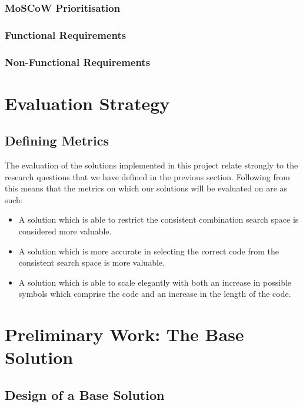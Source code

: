 \documentclass[12pt]{article}  %
\theoremstyle{definition}
\theoremstyle{remark}
\begin{document}
\subsubsection {MoSCoW Prioritisation}

\subsubsection {Functional Requirements}

\subsubsection {Non-Functional Requirements}

\newpage                     %
\section{Evaluation Strategy}\label{ss:back}

\subsection {Defining Metrics}

The evaluation of the solutions implemented in this project relate strongly to the research questions that we have defined in the previous section. Following from this means that the metrics on which our solutions will be evaluated on are as such:
\begin {itemize}
	\item {A solution which is able to restrict the consistent combination search space is considered more valuable.}
	\item {A solution which is more accurate in selecting the correct code from the consistent search space is more valuable.}
	\item {A solution which is able to scale elegantly with both an increase in possible symbols which comprise the code and an increase in the length of the code.}
\end{itemize}

\newpage
\section {Preliminary Work: The Base Solution}

\subsection {Design of a Base Solution}
\end{document}
